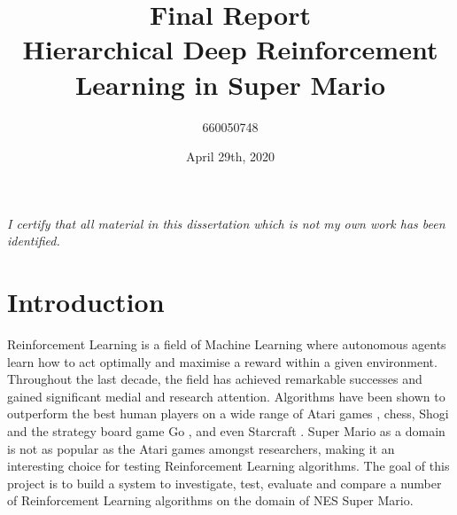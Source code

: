 \documentclass[notitlepage,a4paper,11pt]{article}
\begin{document}
\title{\textbf{Final Report\\
	\large{Hierarchical Deep Reinforcement Learning in Super Mario}}}

\author{660050748}
\date{April 29th, 2020}
\maketitle

\begin{abstract}
 
\end{abstract}


\vspace*{\fill}
\textit{I certify that all material in this dissertation which is not my own work has been identified.}

\fancyhf{}
\fancyhead[LE]{\leftmark}
\fancyhead[RO]{\rightmark}

\fancyfoot[LE,RO]{\thepage}
\pagebreak


\pagebreak
{}
\section{Introduction}
Reinforcement Learning is a field of Machine Learning where autonomous agents learn how to act optimally and maximise a reward within a given environment. Throughout the last decade, the field has achieved remarkable successes and gained significant medial and research attention. Algorithms have been shown to outperform the best human players on a wide range of Atari games \cite{DBLP:journals/corr/MnihKSGAWR13}, chess, Shogi and the strategy board game Go \cite{alpha_go}, and even Starcraft \cite{arulkumaran2019alphastar}. Super Mario as a domain is not as popular as the Atari games amongst researchers, making it an interesting choice for testing Reinforcement Learning algorithms.  The goal of this project is to build a system to investigate, test, evaluate and compare a number of Reinforcement Learning algorithms on the domain of NES Super Mario. 
\end{document}
